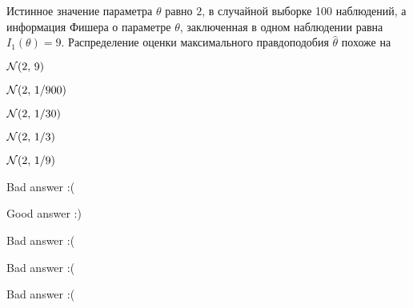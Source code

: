 
\begin{question}
Истинное значение параметра \(\theta\) равно \(2\), в случайной выборке
100 наблюдений, а информация Фишера о параметре \(\theta\), заключенная
в одном наблюдении равна \(I_1(\theta) = 9\). Распределение оценки
максимального правдоподобия \(\hat{\theta}\) похоже на
\begin{answerlist}
  \item \(\mathcal{N}(2, \, 9)\)
  \item \(\mathcal{N}(2, \, 1/900)\)
  \item \(\mathcal{N}(2, \, 1/30)\)
  \item \(\mathcal{N}(2, \, 1/3)\)
  \item \(\mathcal{N}(2, \, 1/9)\)
\end{answerlist}
\end{question}

\begin{solution}
\begin{answerlist}
  \item Bad answer :(
  \item Good answer :)
  \item Bad answer :(
  \item Bad answer :(
  \item Bad answer :(
\end{answerlist}
\end{solution}

